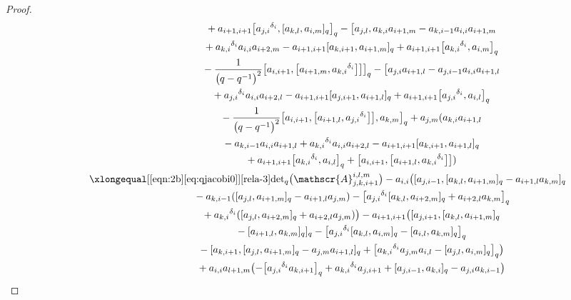 \documentclass[pdftex]{sigma}
\numberwithin{equation}{section}
\def\d{\delta}
\def\A{\mathscr{A}}
\begin{document}
\begin{proof}
\begin{gather*}
 \quad\qquad\qquad\qquad\ \ {}+ a_{i+1,i+1} \bigl[{a_{j,i}}^{\d_i}, [a_{k,l},a_{i,m} ]_q \bigr]_q- \bigl[a_{j,l},a_{k,i}a_{i+1,m}-a_{k,i-1}a_{i,i}a_{i+1,m} \\
 \quad\qquad\qquad\qquad\ \ {}+ {a_{k,i}}^{\d_i}a_{i,i}a_{i+2,m} -a_{i+1,i+1} [a_{k,i+1},a_{i+1,m} ]_q + a_{i+1,i+1} \bigl[{a_{k,i}}^{\d_i},a_{i,m} \bigr]_q \\
\quad\qquad\qquad \qquad\ \ {}-\frac{1}{\bigl(q-q^{-1}\bigr)^2} \bigl[a_{i,i+1}, \bigl[a_{i+1,m}, {a_{k,i}}^{\d_i} \bigr] \bigr] \bigr]_q - \bigl[a_{j,i}a_{i+1,l} -a_{j,i-1}a_{i,i}a_{i+1,l} \\
 \quad\qquad\qquad\qquad\ \ {}+{a_{j,i}}^{\d_i}a_{i,i}a_{i+2,l} -a_{i+1,i+1} [a_{j,i+1},a_{i+1,l} ]_q +a_{i+1,i+1} \bigl[{a_{j,i}}^{\d_i},a_{i,l} \bigr]_q \\
\quad\qquad\qquad \qquad\ \ {}-\frac{1}{\bigl(q-q^{-1}\bigr)^2} \bigl[a_{i,i+1}, \bigl[a_{i+1,l},{a_{j,i}}^{\d_i} \bigr] \bigr],a_{k,m} \bigr]_q +a_{j,m} (a_{k,i}a_{i+1,l} \\
 \quad\qquad\qquad\qquad\ \ {}-a_{k,i-1}a_{i,i}a_{i+1,l}+{a_{k,i}}^{\d_i}a_{i,i}a_{i+2,l} -a_{i+1,i+1} [a_{k,i+1},a_{i+1,l} ]_q\\
\quad\qquad\qquad\qquad\ \ {}+a_{i+1,i+1} \bigl[{a_{k,i}}^{\d_i},a_{i,l} \bigr]_q +\bigl[a_{i,i+1}, \bigl[a_{i+1,l},{a_{k,i}}^{\d_i} \bigr] \bigr] )\\
\quad\qquad \xlongequal[\eqref{eqn:2b}\eqref{eq:qjacobi0}]{\eqref{rela-3}} {\det}_q\bigl(\A_{j,k,i+1}^{i,l,m}\bigr)-a_{i,i} \bigl( [a_{j,i-1}, [a_{k,l}, a_{i+1,m} ]_q -a_{i+1,l}a_{k,m} ]_q \\
 \quad\qquad\qquad\qquad\ \ {}-a_{k,i-1} ( [a_{j,l},a_{i+1,m} ]_q- a_{i+1,l}a_{j,m} )- \bigl[{a_{j,i}}^{\d_i} [a_{k,l},a_{i+2,m} ]_q +a_{i+2,l}a_{k,m} \bigr]_q\!\\
 \quad\qquad\qquad\qquad\ \ {}+{a_{k,i}}^{\d_i} ( [a_{j,l},a_{i+2,m} ]_q + a_{i+2,l}a_{j,m} ) \bigr)-a_{i+1,i+1} \bigl( [a_{j,i+1}, [a_{k,l},a_{i+1,m} ]_q\\
 \quad\qquad\qquad\qquad\ \ {}- [a_{i+1,l}, a_{k,m} ]_q ]_q- \bigl[{a_{j,i}}^{\d_i} [a_{k,l},a_{i,m} ]_q - [a_{i,l},a_{k,m} ]_q \bigr]_q
\\
 \quad\qquad\qquad\qquad\ \ {}- [a_{k,i+1}, [a_{j,l},a_{i+1,m} ]_q-a_{j,m}a_{i+1,l} ]_q + \bigl[{a_{k,i}}^{\d_i}a_{j,m}a_{i,l} - [a_{j,l},a_{i,m} ]_q \bigr]_q \bigr)\\
 \quad\qquad\qquad\qquad\ \ {}+a_{i,i}a_{l+1,m} \bigl(- \bigl[{a_{j,i}}^{\d_i}a_{k,i+1} \bigr]_q+{a_{k,i}}^{\d_i}a_{j,i+1} + [a_{j,i-1},a_{k,i} ]_q-a_{j,i}a_{k,i-1} \bigr)\\

\end{gather*}
\end{proof}
\end{document}
